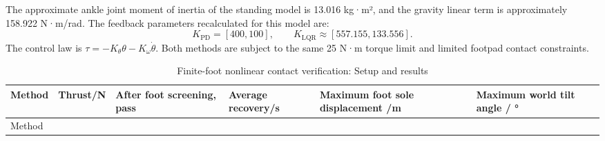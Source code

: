 The approximate ankle joint moment of inertia of the standing model is 13.016 kg·m², and the gravity linear term is approximately 158.922 N·m/rad. The feedback parameters recalculated for this model are:
\begin{equation}
K_{\mathrm{PD}}=[400,100],\qquad K_{\mathrm{LQR}}\approx[557.155,133.556].
\end{equation}
The control law is $\tau=-K_\theta\theta-K_\omega\dot\theta$. Both methods are subject to the same 25 N·m torque limit and limited footpad contact constraints.

\FloatBarrier\begingroup\small\setlength{\tabcolsep}{2.5pt}
\begin{longtable}[]{@{}
  >{\raggedright\arraybackslash}p{}
  >{\raggedright\arraybackslash}p{}
  >{\raggedright\arraybackslash}p{}
  >{\raggedright\arraybackslash}p{}
  >{\raggedright\arraybackslash}p{}
  >{\raggedright\arraybackslash}p{}@{}}
\caption{Finite-foot nonlinear contact verification: Setup and results}\label{tab:s19-2}\tabularnewline
\toprule\noalign{}
\begin{minipage}[b]{\linewidth}\raggedright
Method
\end{minipage} & \begin{minipage}[b]{\linewidth}\raggedright
Thrust/N
\end{minipage} & \begin{minipage}[b]{\linewidth}\raggedright
After foot screening, pass
\end{minipage} & \begin{minipage}[b]{\linewidth}\raggedright
Average recovery/s
\end{minipage} & \begin{minipage}[b]{\linewidth}\raggedright
Maximum foot sole displacement /m
\end{minipage} & \begin{minipage}[b]{\linewidth}\raggedright
Maximum world tilt angle / °
\end{minipage} \\
\midrule\noalign{}
\endfirsthead
\toprule\noalign{}
\begin{minipage}[b]{\linewidth}\raggedright
Method
\end{minipage} & \begin{minipage}[b]{\linewidth}\raggedright

\end{minipage}
\end{longtable}

